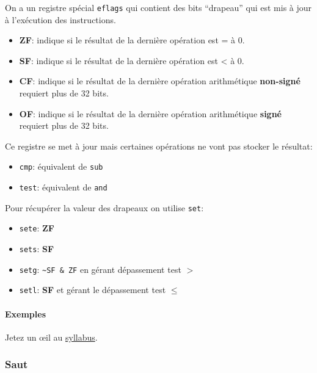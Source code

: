 On a un registre spécial \texttt{eflags} qui contient des bits
``drapeau'' qui est mis à jour à l'exécution des instructions.

\begin{itemize}
\tightlist
\item
  \textbf{ZF}: indique si le résultat de la dernière opération est = à
  0.
\item
  \textbf{SF}: indique si le résultat de la dernière opération est
  \textless{} à 0.
\item
  \textbf{CF}: indique si le résultat de la dernière opération
  arithmétique \textbf{non-signé} requiert plus de 32 bits.
\item
  \textbf{OF}: indique si le résultat de la dernière opération
  arithmétique \textbf{signé} requiert plus de 32 bits.
\end{itemize}

Ce registre se met à jour mais certaines opérations ne vont pas stocker
le résultat:

\begin{itemize}
\tightlist
\item
  \texttt{cmp}: équivalent de \texttt{sub}
\item
  \texttt{test}: équivalent de \texttt{and}
\end{itemize}

Pour récupérer la valeur des drapeaux on utilise \texttt{set}:

\begin{itemize}
\tightlist
\item
  \texttt{sete}: \textbf{ZF}
\item
  \texttt{sets}: \textbf{SF}
\item
  \texttt{setg}: \texttt{\textasciitilde{}SF\ \&\ ZF} en gérant
  dépassement test \(>\)
\item
  \texttt{setl}: \textbf{SF} et gérant le dépassement test \(\leqslant\)
\end{itemize}

\paragraph{Exemples}\label{exemples}

Jetez un œil au
\href{https://sites.uclouvain.be/SystInfo/notes/Theorie/Assembleur/memory.html}{syllabus}.

\subsubsection{Saut}\label{saut}

